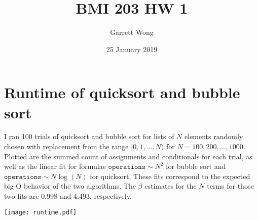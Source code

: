 \documentclass[]{article}
\begin{document}
\title{BMI 203 HW 1}
\author{Garrett Wong}
\date{25 January 2019}
\maketitle

\section*{Runtime of quicksort and bubble sort}
I ran 100 trials of quicksort and bubble sort for lists of $N$ elements randomly chosen with replacement from the range $[0, 1, \ldots, N)$ for $N = 100, 200, \ldots, 1000$. Plotted are the summed count of assignments and conditionals for each trial, as well as the linear fit for formulae $\texttt{operations} \sim N^2$ for bubble sort and $\texttt{operations} \sim N\log(N)$ for quicksort. These fits correspond to the expected big-O behavior of the two algorithms. The $\beta$ estimates for the $N$ terms for those two fits are 0.998 and 4.493, respectively.
\vspace{4em}

\texttt{[image: runtime.pdf]}
\end{document}
